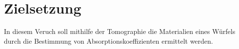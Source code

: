 \section{Zielsetzung}
\label{sec:Zielsetzung}
In diesem Veruch soll mithilfe der Tomographie die Materialien eines Würfels durch die
Bestimmung von Absorptionskoeffizienten ermittelt werden.
